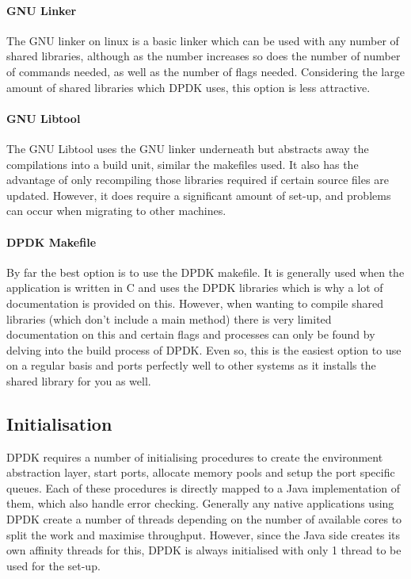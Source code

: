 \documentclass[final_report.tex]{subfiles}
\begin{document}
\paragraph*{GNU Linker}
The GNU linker on linux is a basic linker which can be used with any number of shared libraries, although as the number increases so does the number of number of commands needed, as well as the number of flags needed. Considering the large amount of shared libraries which DPDK uses, this option is less attractive.

\paragraph*{GNU Libtool}
The GNU Libtool uses the GNU linker underneath but abstracts away the compilations into a build unit, similar the makefiles used. It also has the advantage of only recompiling those libraries required if certain source files are updated. However, it does require a significant amount of set-up, and problems can occur when migrating to other machines.

\paragraph*{DPDK Makefile}
By far the best option is to use the DPDK makefile. It is generally used when the application is written in C and uses the DPDK libraries which is why a lot of documentation is provided on this. However, when wanting to compile shared libraries (which don't include a main method) there is very limited documentation on this and certain flags and processes can only be found by delving into the build process of DPDK. Even so, this is the easiest option to use on a regular basis and ports perfectly well to other systems as it installs the shared library for you as well.

\subsection{Initialisation}
DPDK requires a number of initialising procedures to create the environment abstraction layer, start ports, allocate memory pools and setup the port specific queues. Each of these procedures is directly mapped to a Java implementation of them, which also handle error checking. Generally any native applications using DPDK create a number of threads depending on the number of available cores to split the work and maximise throughput. However, since the Java side creates its own affinity threads for this, DPDK is always initialised with only 1 thread to be used for the set-up.
\end{document}
